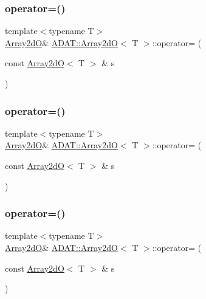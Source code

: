 \subsubsection{\texorpdfstring{operator=()}{operator=()}\hspace{0.1cm}{\footnotesize\ttfamily [1/6]}}
{\footnotesize\ttfamily template$<$typename T$>$ \\
\mbox{\hyperlink{classADAT_1_1Array2dO}{Array2dO}}\& \mbox{\hyperlink{classADAT_1_1Array2dO}{A\+D\+A\+T\+::\+Array2dO}}$<$ T $>$\+::operator= (\begin{DoxyParamCaption}\item[{const \mbox{\hyperlink{classADAT_1_1Array2dO}{Array2dO}}$<$ T $>$ \&}]{s }\end{DoxyParamCaption})\hspace{0.3cm}{\ttfamily [inline]}}

\mbox{\label{classADAT_1_1Array2dO_a258fcfecc226990cc40b36f1edb2f4d5}} 
\subsubsection{\texorpdfstring{operator=()}{operator=()}\hspace{0.1cm}{\footnotesize\ttfamily [2/6]}}
{\footnotesize\ttfamily template$<$typename T$>$ \\
\mbox{\hyperlink{classADAT_1_1Array2dO}{Array2dO}}\& \mbox{\hyperlink{classADAT_1_1Array2dO}{A\+D\+A\+T\+::\+Array2dO}}$<$ T $>$\+::operator= (\begin{DoxyParamCaption}\item[{const \mbox{\hyperlink{classADAT_1_1Array2dO}{Array2dO}}$<$ T $>$ \&}]{s }\end{DoxyParamCaption})\hspace{0.3cm}{\ttfamily [inline]}}

\mbox{\label{classADAT_1_1Array2dO_a258fcfecc226990cc40b36f1edb2f4d5}} 
\subsubsection{\texorpdfstring{operator=()}{operator=()}\hspace{0.1cm}{\footnotesize\ttfamily [3/6]}}
{\footnotesize\ttfamily template$<$typename T$>$ \\
\mbox{\hyperlink{classADAT_1_1Array2dO}{Array2dO}}\& \mbox{\hyperlink{classADAT_1_1Array2dO}{A\+D\+A\+T\+::\+Array2dO}}$<$ T $>$\+::operator= (\begin{DoxyParamCaption}\item[{const \mbox{\hyperlink{classADAT_1_1Array2dO}{Array2dO}}$<$ T $>$ \&}]{s }\end{DoxyParamCaption})\hspace{0.3cm}{\ttfamily [inline]}}

